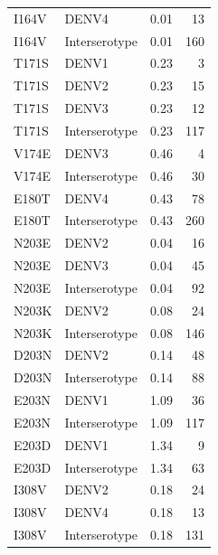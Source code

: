 \documentclass[11pt,oneside,letterpaper]{article}
\begin{document}
\begin{centering}
\begin{table}[ht]
{\begin{tabular}{llrr}
                           I164V &          DENV4 &  0.01 &     13 \\
                           I164V &  Interserotype &  0.01 &    160 \\
                           T171S &          DENV1 &  0.23 &      3 \\
                           T171S &          DENV2 &  0.23 &     15 \\
                           T171S &          DENV3 &  0.23 &     12 \\
                           T171S &  Interserotype &  0.23 &    117 \\
                           V174E &          DENV3 &  0.46 &      4 \\
                           V174E &  Interserotype &  0.46 &     30 \\
                           E180T &          DENV4 &  0.43 &     78 \\
                           E180T &  Interserotype &  0.43 &    260 \\
                           N203E &          DENV2 &  0.04 &     16 \\
                           N203E &          DENV3 &  0.04 &     45 \\
                           N203E &  Interserotype &  0.04 &     92 \\
                           N203K &          DENV2 &  0.08 &     24 \\
                           N203K &  Interserotype &  0.08 &    146 \\
                           D203N &          DENV2 &  0.14 &     48 \\
                           D203N &  Interserotype &  0.14 &     88 \\
                           E203N &          DENV1 &  1.09 &     36 \\
                           E203N &  Interserotype &  1.09 &    117 \\
                           E203D &          DENV1 &  1.34 &      9 \\
                           E203D &  Interserotype &  1.34 &     63 \\
                           I308V &          DENV2 &  0.18 &     24 \\
                           I308V &          DENV4 &  0.18 &     13 \\
                           I308V &  Interserotype &  0.18 &    131 \\

\end{tabular}}
\end{table}
\end{centering}
\end{document}
